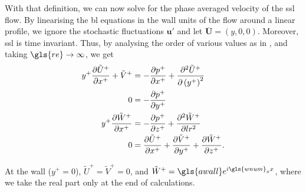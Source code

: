 With that definition, we can now solve for the phase averaged velocity of the \gls{ssl} flow. By linearising the \gls{bl} equations in the wall units of the flow around a linear profile, we ignore the stochastic fluctuations $\mathbf{u'} $ and let $\overline{\mathbf{U} } = (y,0,0)$. Moreover, \gls{ssl} is time invariant. Thus, by analysing the order of various values as in \cite{schlichting2017}, and taking $\gls{re}\to \infty$, we get
\begin{align}
	y^{+} \pdv{\tilde{U}^{+}}{x^{+}} + \tilde{V}^{+} &= -\pdv{p^{+}}{x^{+}} + \pdv[2]{\tilde{U}^{+}}{\left(y^{+}\right)} \\
	0 &= -\pdv{p^{+}}{y^{+}}  \\
	y^{+} \pdv{\tilde{W}^{+}}{x^{+}} &= -\pdv{p^{+}}{z^{+}} + \pdv[2]{\tilde{W}^{+}}{lr} \\
	0 &= \pdv{\tilde{U}^{+}}{x^{+}} +\pdv{\tilde{V}^{+}}{y^{+}} +\pdv{\tilde{W}^{+}}{z^{+}} 
.\end{align}

At the wall ($y^{+}=0$),  $\tilde{U}^{+}=\tilde{V}^{+}=0$, and $\tilde{W}^{+}=\gls{awall}e^{i \gls{wnum}_x x}$, where we take the real part only at the end of calculations.






